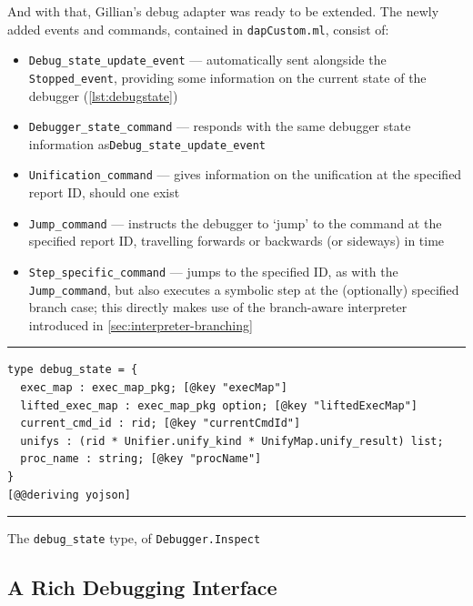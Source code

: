 And with that, Gillian's debug adapter was ready to be extended. The newly added
events and commands, contained in \texttt{dapCustom.ml}, consist of:
\begin{itemize}
  \item \texttt{Debug\_state\_update\_event} --- automatically sent alongside
        the \texttt{Stopped\_event}, providing some information on the current
        state of the debugger (\autoref{lst:debugstate})
  \item \texttt{Debugger\_state\_command} --- responds with the same debugger
        state information as\newline\texttt{Debug\_state\_update\_event}
  \item \texttt{Unification\_command} --- gives information on the unification
        at the specified report ID, should one exist
  \item \texttt{Jump\_command} --- instructs the debugger to `jump' to the
        command at the specified report ID, travelling forwards or backwards
        (or sideways) in time
  \item \texttt{Step\_specific\_command} --- jumps to the specified ID, as with
        the \texttt{Jump\_command}, but also executes a symbolic step at the
        (optionally) specified branch case; this directly makes use of the
        branch-aware interpreter introduced in
        \autoref{sec:interpreter-branching}
\end{itemize}

\begin{listing}[!ht]
\noindent\rule{\textwidth}{0.5pt}
\vspace{-0.6cm}
\begin{verbatim}
type debug_state = {
  exec_map : exec_map_pkg; [@key "execMap"]
  lifted_exec_map : exec_map_pkg option; [@key "liftedExecMap"]
  current_cmd_id : rid; [@key "currentCmdId"]
  unifys : (rid * Unifier.unify_kind * UnifyMap.unify_result) list;
  proc_name : string; [@key "procName"]
}
[@@deriving yojson]
\end{verbatim}
\vspace{-0.4cm}
\noindent\rule{\textwidth}{0.5pt}
\vspace{-0.6cm}
\caption{The \texttt{debug\_state} type, of \texttt{Debugger.Inspect}}
\label{lst:debugstate}
\end{listing}


\subsection{A Rich Debugging Interface}

